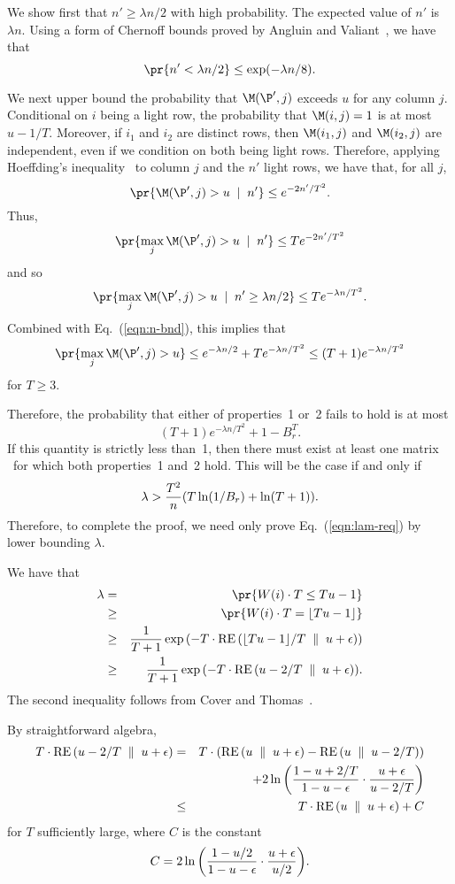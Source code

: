 We show first that $n'\geq \lambda n/2$ with high probability.
The expected value of $n'$ is $\lambda n$.
Using a form of Chernoff bounds proved by Angluin and
Valiant~\cite{AngluinVa79}, we have that
\begin{equation}  \label{eqn:n-bnd}
 \pr{n' < \lambda n / 2} \leq \exp(-\lambda n / 8).
\end{equation}

We next upper bound the probability that $\M(\P',j)$ exceeds $u$ for
any column $j$.
Conditional on $i$ being a light row, the probability that $\M(i,j) =
1$ is at most $u-1/T$.
Moreover, if $i_1$ and $i_2$ are distinct rows, then $\M(i_1,j)$ and
$\M(i_2,j)$ are independent, even if we condition on both being light
rows.
Therefore, applying Hoeffding's inequality~\cite{Hoeffding63}
to column $j$ and the $n'$ light rows, we have that, for all $j$,
\[
\pr{\M(\P',j) > u \cond n'} \leq e^{-2n' / T^2}.
\]
Thus,
\[
\pr{\max_j \M(\P',j) > u \cond n'} \leq T e^{-2n' / T^2}
\]
and so
\[
\pr{\max_j \M(\P',j) > u \cond n' \geq \lambda n / 2} \leq
        T e^{-\lambda n/ T^2}.
\]
Combined with Eq.~(\ref{eqn:n-bnd}), this implies that
\[
\pr{\max_j \M(\P',j) > u} \leq e^{-\lambda n / 2} + T e^{-\lambda n / T^2}
     \leq (T+1) e^{-\lambda n / T^2}
\]
for $T\geq 3$.

Therefore, the probability that either of properties~1 or~2 fails to
hold is at most
\[  (T+1) e^{-\lambda n / T^2} + 1 - B_r^T. \]
If this quantity is strictly less than~1, then there must exist at
least one matrix \M\ for which both properties~1 and~2 hold.
This will be the case if and only if
\begin{equation} \label{eqn:lam-req}
\lambda > \frac{T^2}{n} {\left({T\ln(1/B_r) + \ln(T+1)}\right)}.
\end{equation}
Therefore, to complete the proof, we need only prove
Eq.~(\ref{eqn:lam-req}) by lower bounding $\lambda$.

We have that
\begin{eqnarray*}
\lambda &=& \pr{W(i)\cdot T \leq T u - 1} \\
 &\geq& \pr{W(i)\cdot T = \floor{T u - 1}} \\
 &\geq& \frac{1}{T+1} \exp\paren{-T \cdot \RE{\floor{T u - 1}/T}{u+\epsilon}}\\
 &\geq& \frac{1}{T+1} \exp\paren{-T \cdot \RE{u - 2/T}{u+\epsilon}}.
\end{eqnarray*}
The second inequality follows from Cover and
Thomas~\cite[Theorem~12.1.4]{CoverTh91}.

By straightforward algebra,
\begin{eqnarray*}
T \cdot {\rm RE}\left( {u - 2/T} \; \parallel \; {u+\epsilon} \right) &=&
     T \cdot ({\rm RE}\left( {u} \; \parallel \; {u+\epsilon} \right) - {\rm RE}\left( {u} \; \parallel \; {u - 2/T} \right)) \\
 && + 2 \ln{\left({\frac{1-u+2/T}{1-u-\epsilon}\cdot
                  \frac{u+\epsilon}{u-2/T}}\right)} \\
 &\leq& T\cdot {\rm RE}\left( {u} \; \parallel \; {u+\epsilon} \right) + C
\end{eqnarray*}
for $T$ sufficiently large, where $C$ is the constant
\[ C = 2\ln{\left({\frac{1-u/2}{1-u-\epsilon}\cdot \frac{u+\epsilon}{u/2}}\right)}.\]

